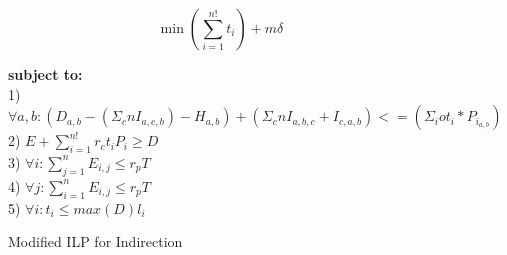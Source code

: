 \begin{figure}[t]
\small
\centering
\begin{mdframed}
\[
\min \left(\sum_{i=1}^{n!} t_i\right) + m\delta
\]
\begin{tabbing}
\textbf{subject to:}\\[4pt]
1)  $\forall a, b: (D_{a,b} - (\Sigma_{c}{n} I_{a,c,b}) - H_{a,b})
    + (\Sigma_{c}{n} I_{a,b,c} + I_{c,a,b})
    <= (\Sigma_{i}{o} t_i * P_{i_{a,b}})$ \\[4pt]
2) $E + \sum_{i=1}^{n!} r_c t_i P_i \geq D$\\[4pt]
3) $\forall i: \sum_{j=1}^{n} E_{i,j} \leq r_p T$\\[4pt]
4) $\forall j: \sum_{i=1}^{n} E_{i,j} \leq r_p T$\\[4pt]
5) $\forall i: t_i \leq \textit{max}(D) l_i$
\end{tabbing}
\end{mdframed}
\caption{Modified ILP for Indirection}
\label{fig:hybrid-indirection}
\end{figure}




